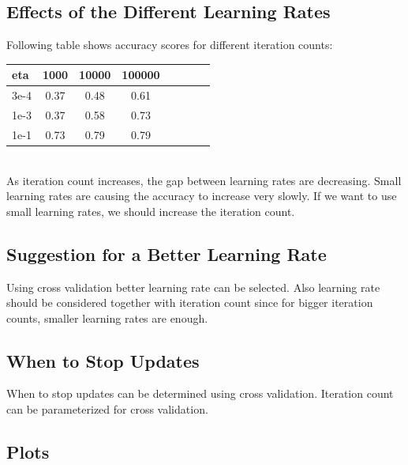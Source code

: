 \documentclass[conference]{IEEEtran}
\begin{document}
\subsection{Effects of the Different Learning Rates}

Following table shows accuracy scores for different iteration counts: \\

\begin{tabular}{l*{6}{c}r}
eta  & 1000 & 10000 & 100000 \\
\hline
3e-4 & 0.37 & 0.48 & 0.61 \\
1e-3 & 0.37 & 0.58 & 0.73 \\
1e-1 & 0.73 & 0.79 & 0.79 \\
\end{tabular} \\

As iteration count increases, the gap between learning rates are decreasing. Small learning rates are causing the accuracy to increase very slowly. If we want to use small learning rates, we should increase the iteration count.

\subsection{Suggestion for a Better Learning Rate}

Using cross validation better learning rate can be selected. Also learning rate should be considered together with iteration count since for bigger iteration counts, smaller learning rates are enough.

\subsection{When to Stop Updates}

When to stop updates can be determined using cross validation. Iteration count can be parameterized for cross validation.

\subsection{Plots}
\end{document}
